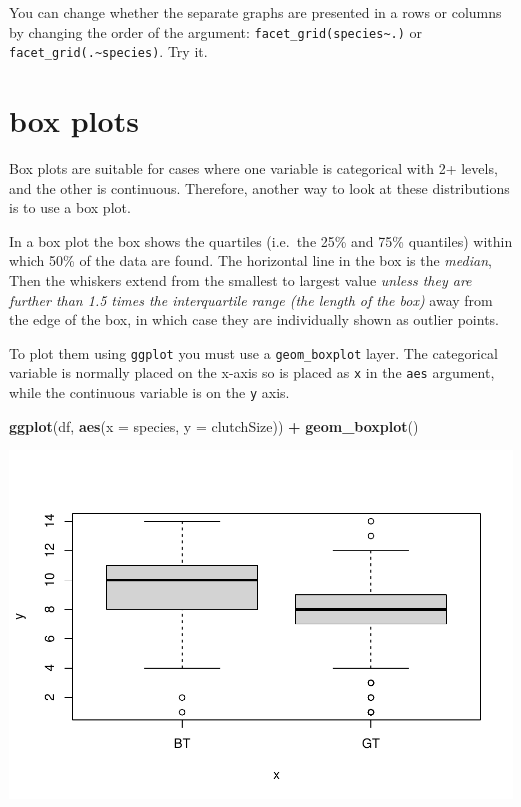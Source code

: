 \documentclass[
  a4paperpaper,
]{book}
\newenvironment{Shaded}{\begin{snugshade}}{\end{snugshade}}
\newcommand{\DataTypeTok}[1]{\textcolor[rgb]{0.13,0.29,0.53}{#1}}
\newcommand{\KeywordTok}[1]{\textcolor[rgb]{0.13,0.29,0.53}{\textbf{#1}}}
\newcommand{\NormalTok}[1]{#1}
\newcommand{\OperatorTok}[1]{\textcolor[rgb]{0.81,0.36,0.00}{\textbf{#1}}}
\newcommand{\StringTok}[1]{\textcolor[rgb]{0.31,0.60,0.02}{#1}}
\begin{document}
You can change whether the separate graphs are presented in a rows or columns by changing the order of the argument: \texttt{facet\_grid(species\textasciitilde{}.)} or \texttt{facet\_grid(.\textasciitilde{}species)}. Try it.

\hypertarget{box-plots}{%
\section{box plots}\label{box-plots}}

Box plots are suitable for cases where one variable is categorical with 2+ levels, and the other is continuous. Therefore, another way to look at these distributions is to use a box plot.

In a box plot the box shows the quartiles (i.e.~the 25\% and 75\% quantiles) within which 50\% of the data are found. The horizontal line in the box is the \emph{median}, Then the whiskers extend from the smallest to largest value \emph{unless they are further than 1.5 times the interquartile range (the length of the box)} away from the edge of the box, in which case they are individually shown as outlier points.

To plot them using \texttt{ggplot} you must use a \texttt{geom\_boxplot} layer.
The categorical variable is normally placed on the x-axis so is placed as \texttt{x} in the \texttt{aes} argument, while the continuous variable is on the \texttt{y} axis.

\begin{Shaded}
\begin{Highlighting}[]
\KeywordTok{ggplot}\NormalTok{(df, }\KeywordTok{aes}\NormalTok{(}\DataTypeTok{x =}\NormalTok{ species, }\DataTypeTok{y =}\NormalTok{ clutchSize)) }\OperatorTok{+}
\StringTok{         }\KeywordTok{geom\_boxplot}\NormalTok{()}
\end{Highlighting}
\end{Shaded}

\includegraphics{BB852_files/figure-latex/unnamed-chunk-79-1.pdf}
\end{document}
